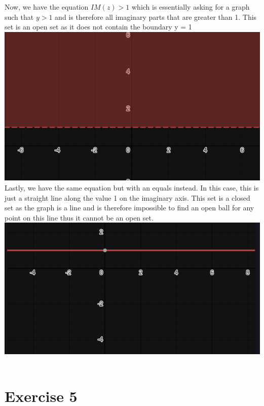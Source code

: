 \documentclass[notitlepage]{article}
\begin{document}
    Now, we have the equation $IM(z) > 1$ which is essentially asking for a graph such that $y > 1$
    and is therefore all imaginary parts that are greater than 1. This set is an open set as it does
    not contain the boundary y = 1\\
\includegraphics[scale=0.5]{hw1_4_3} \\
    Lastly, we have the same equation but with an equals instead. In this case, this is just a straight
    line along the value 1 on the imaginary axis. This set is a closed set as the graph is a line and is
    therefore impossible to find an open ball for any point on this line thus it cannot be an open set.\\
\includegraphics[scale=0.5]{hw1_4_4} \\~\\

\section*{Exercise 5}
\end{document}
